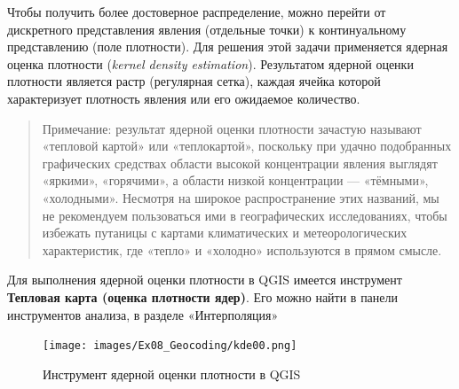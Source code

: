 \documentclass[
  12pt,
]{book}
\begin{document}
Чтобы получить более достоверное распределение, можно перейти от дискретного представления явления (отдельные точки) к континуальному представлению (поле плотности). Для решения этой задачи применяется ядерная оценка плотности (\emph{kernel density estimation}). Результатом ядерной оценки плотности является растр (регулярная сетка), каждая ячейка которой характеризует плотность явления или его ожидаемое количество.

\begin{quote}
Примечание: результат ядерной оценки плотности зачастую называют «тепловой картой» или «теплокартой», поскольку при удачно подобранных графических средствах области высокой концентрации явления выглядят «яркими», «горячими», а области низкой концентрации --- «тёмными», «холодными». Несмотря на широкое распространение этих названий, мы не рекомендуем пользоваться ими в географических исследованиях, чтобы избежать путаницы с картами климатических и метеорологических характеристик, где «тепло» и «холодно» используются в прямом смысле.
\end{quote}

Для выполнения ядерной оценки плотности в QGIS имеется инструмент \textbf{Тепловая карта (оценка плотности ядер)}. Его можно найти в панели инструментов анализа, в разделе «Интерполяция»

\begin{figure}
\centering
\texttt{[image: images/Ex08\_Geocoding/kde00.png]}
\caption{Инструмент ядерной оценки плотности в QGIS}
\end{figure}
\end{document}
